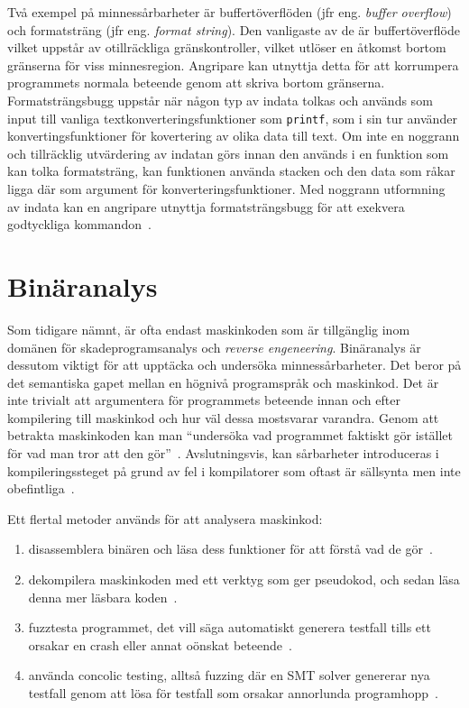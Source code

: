 Två exempel på minnessårbarheter är buffertöverflöden (jfr eng. \emph{buffer
overflow}) och formatsträng (jfr eng. \emph{format string}). Den
vanligaste av de är buffertöverflöde vilket uppstår av otillräckliga
gränskontroller, vilket utlöser en åtkomst bortom gränserna för viss
minnesregion. Angripare kan utnyttja detta för att korrumpera programmets
normala beteende genom att skriva bortom gränserna. Formatsträngsbugg uppstår
när någon typ av indata tolkas och används som input till vanliga
textkonverteringsfunktioner som \texttt{printf}, som i sin tur använder
konvertingsfunktioner för kovertering av olika data till text. Om inte en
noggrann och tillräcklig utvärdering av indatan görs innan den används i en
funktion som kan tolka formatsträng, kan funktionen använda stacken och den
data som råkar ligga där som argument för konverteringsfunktioner. Med noggrann
utformning av indata kan en angripare utnyttja formatsträngsbugg för att
exekvera godtyckliga kommandon~\cite{computer_security_cs161}.


\section{Binäranalys}
\label{sec:binar_analys}
Som tidigare nämnt, är ofta endast maskinkoden som är tillgänglig inom domänen
för skadeprogramsanalys och \emph{reverse engeneering}. Binäranalys är dessutom
viktigt för att upptäcka och undersöka minnessårbarheter. Det beror på det
semantiska gapet mellan en högnivå programspråk och maskinkod. Det är inte
trivialt att argumentera för programmets beteende innan och efter kompilering
till maskinkod och hur väl dessa mostsvarar varandra. Genom att betrakta
maskinkoden kan man ``undersöka vad programmet faktiskt gör istället för vad
man tror att den gör''~\cite{andriesse2018}. Avslutningsvis, kan sårbarheter
introduceras i kompileringssteget på grund av fel i kompilatorer som oftast är
sällsynta men inte obefintliga~\cite{dusilent}.

Ett flertal metoder används för att analysera maskinkod:
\begin{enumerate}
    \item disassemblera binären och läsa dess funktioner för att förstå vad de gör~\cite{ghidra_website}.
    \item dekompilera maskinkoden med ett verktyg som ger pseudokod, och sedan läsa denna mer
        läsbara koden~\cite{ghidra_website}.
    \item fuzztesta programmet, det vill säga automatiskt generera testfall tills ett orsakar en crash eller
          annat oönskat beteende~\cite{8371326}.
    \item använda concolic testing, alltså fuzzing där en SMT solver genererar nya testfall genom att
        lösa för testfall som orsakar annorlunda programhopp~\cite{sage}.
\end{enumerate}

